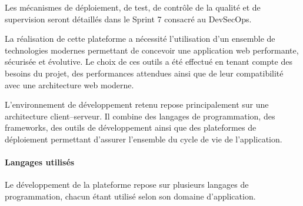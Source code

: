 Les mécanismes de déploiement, de test, de contrôle de la qualité et de supervision seront détaillés dans le Sprint 7 consacré au DevSecOps.

\iffalse

La réalisation de cette plateforme a nécessité l'utilisation d'un ensemble de technologies modernes permettant de concevoir une application web performante, sécurisée et évolutive. Le choix de ces outils a été effectué en tenant compte des besoins du projet, des performances attendues ainsi que de leur compatibilité avec une architecture web moderne.

L'environnement de développement retenu repose principalement sur une architecture client--serveur. Il combine des langages de programmation, des frameworks, des outils de développement ainsi que des plateformes de déploiement permettant d'assurer l'ensemble du cycle de vie de l'application.

\paragraph{Langages utilisés}

Le développement de la plateforme repose sur plusieurs langages de programmation, chacun étant utilisé selon son domaine d'application.

